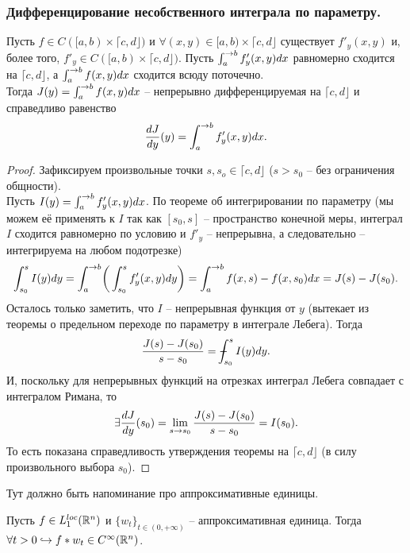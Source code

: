 \subsubsection{Дифференцирование несобственного интеграла по параметру.}
\begin{theorem}
    Пусть $f \in C([a, b) \times \lceil c, d \rfloor)$ и $\forall (x, y) \in [a, b) \times \lceil c, d \rfloor$ существует $f'_y(x, y)$ и, более того, $f'_y \in C([a, b) \times \lceil c, d \rfloor)$.
    Пусть $\int_a^{\rightarrow b} f'_y(x, y)dx$ равномерно сходится на $\lceil c, d \rfloor$, а $\int_a^{\rightarrow b} f(x, y)dx$ сходится всюду поточечно. \\
    Тогда $J(y) = \int_a^{\rightarrow b} f(x, y)dx$ -- непрерывно дифференцируемая на $\lceil c, d \rfloor$ и справедливо равенство
    \[
        \dfrac{dJ}{dy}(y) = \int_a^{\rightarrow b} f'_y(x, y)dx.
    \]
\end{theorem}
\begin{proof}
    Зафиксируем произвольные точки $s, s_o \in \lceil c, d \rfloor$ ($s > s_0$ -- без ограничения общности). \\
    Пусть $I(y) = \int_a^{\rightarrow b} f'_y(x, y)dx$.
    По теореме об интегрировании по параметру (мы можем её применять к $I$ так как $[s_0, s]$ -- пространство конечной меры, интеграл $I$ сходится равномерно по условию и $f'_y$ -- непрерывна, а следовательно -- интегрируема на любом подотрезке)
    \[
        \int_{s_0}^s I(y)dy = \int_a^{\rightarrow b} \biggr(\int_{s_0}^s f'_y(x, y)dy\biggr) = \int_a^{\rightarrow b} f(x, s) - f(x, s_0)dx = J(s) - J(s_0).
    \]
    Осталось только заметить, что $I$ -- непрерывная функция от $y$ (вытекает из теоремы о предельном переходе по параметру в интеграле Лебега).
    Тогда
    \[
        \dfrac{J(s) - J(s_0)}{s - s_0} = \dashint_{s_0}^s I(y)dy.
    \]
    И, поскольку для непрерывных функций на отрезках интеграл Лебега совпадает с интегралом Римана, то
    \[
        \exists \dfrac{dJ}{dy}(s_0) = \lim\limits_{s \rightarrow s_0} \dfrac{J(s) - J(s_0)}{s - s_0} = I(s_0).
    \]
    То есть показана справедливость утверждения теоремы на $\lceil c, d \rfloor$ (в силу произвольного выбора $s_0$).
\end{proof}
\begin{reminder}
    Тут должно быть напоминание про аппроксимативные единицы.
\end{reminder}
\begin{corollary}
    Пусть $f \in L_1^{loc}(\mathbb{R}^n)$ и $\{w_t\}_{t \in (0, +\infty)}$ -- аппроксимативная единица.
    Тогда $\forall t > 0 \hookrightarrow f * w_t \in C^{\infty}(\mathbb{R}^n)$.
\end{corollary}
